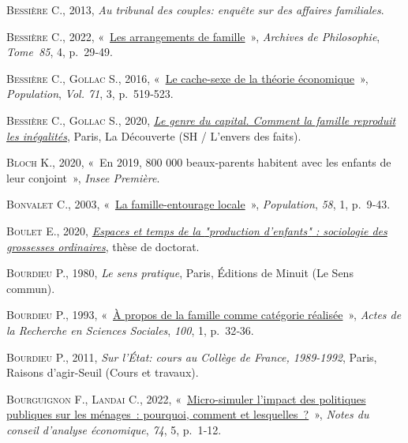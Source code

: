 \documentclass[
  12pt,
]{book}
\newlength{\cslhangindent}
\newenvironment{CSLReferences}[2] %
 {\begin{list}{}{%
  \setlength{\itemindent}{0pt}
  \setlength{\leftmargin}{0pt}
  \setlength{\parsep}{0pt}
  \ifodd #1
   \setlength{\leftmargin}{\cslhangindent}
   \setlength{\itemindent}{-1\cslhangindent}
  \fi
  \setlength{\itemsep}{#2\baselineskip}}}
 {\end{list}}
\begin{document}
\begin{CSLReferences}{0}{1}
\textsc{Bessière C.}, 2013, \emph{Au tribunal des couples: enquête sur
des affaires familiales}.

\textsc{Bessière C.}, 2022,
{«~\href{https://doi.org/10.3917/aphi.854.0029}{Les arrangements de
famille}~»}, \emph{Archives de Philosophie}, \emph{Tome~85}, 4,
p.~29‑49.

\textsc{Bessière C.}, \textsc{Gollac S.}, 2016,
{«~\href{https://www.cairn.info/revue-population-2016-3-page-519.htm}{Le
cache-sexe de la théorie économique}~»}, \emph{Population}, \emph{Vol.
71}, 3, p.~519‑523.

\textsc{Bessière C.}, \textsc{Gollac S.}, 2020,
\emph{\href{https://www.cairn.info/le-genre-du-capital--9782348044380.htm}{Le
genre du capital. Comment la famille reproduit les inégalités}}, Paris,
La Découverte (SH / L'envers des faits).

\textsc{Bloch K.}, 2020, {«~En 2019, 800 000 beaux-parents habitent avec
les enfants de leur conjoint~»}, \emph{Insee Première}.

\textsc{Bonvalet C.}, 2003,
{«~\href{https://doi.org/10.3917/popu.301.0009}{La famille-entourage
locale}~»}, \emph{Population}, \emph{58}, 1, p.~9‑43.

\textsc{Boulet E.}, 2020,
\emph{\href{https://theses.fr/2020LYSE2034}{Espaces et temps de la
{"}production d'enfants{"} : sociologie des grossesses ordinaires}},
thèse de doctorat.

\textsc{Bourdieu P.}, 1980, \emph{Le sens pratique}, Paris, Éditions de
Minuit (Le Sens commun).

\textsc{Bourdieu P.}, 1993,
{«~\href{https://doi.org/10.3406/arss.1993.3070}{À propos de la famille
comme catégorie réalisée}~»}, \emph{Actes de la Recherche en Sciences
Sociales}, \emph{100}, 1, p.~32‑36.

\textsc{Bourdieu P.}, 2011, \emph{Sur l'État: cours au Collège de
France, 1989-1992}, Paris, Raisons d'agir-Seuil (Cours et travaux).

\textsc{Bourguignon F.}, \textsc{Landai C.}, 2022,
{«~\href{https://doi.org/10.3917/ncae.074.0001}{Micro-simuler l{'}impact
des politiques publiques sur les ménages~: pourquoi, comment et
lesquelles~?}~»}, \emph{Notes du conseil d{'}analyse économique},
\emph{74}, 5, p.~1‑12.


\end{CSLReferences}
\end{document}
